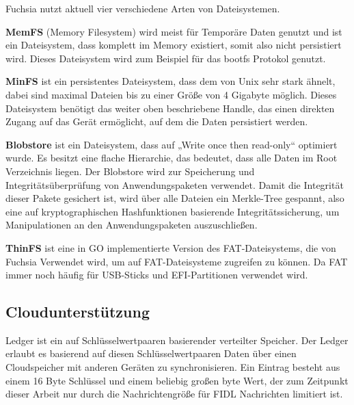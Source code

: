 \documentclass[a4paper]{scrartcl}
\begin{document}
Fuchsia nutzt aktuell vier verschiedene Arten von Dateisystemen.

\textbf{MemFS} (Memory Filesystem) wird meist für Temporäre Daten genutzt und ist ein Dateisystem, dass komplett im Memory existiert, somit also nicht persistiert wird. Dieses Dateisystem wird zum Beispiel für das bootfs Protokol genutzt.

\textbf{MinFS} ist ein persistentes Dateisystem, dass dem von Unix sehr stark ähnelt, dabei sind maximal Dateien bis zu einer Größe von 4 Gigabyte möglich. Dieses Dateisystem benötigt das weiter oben beschriebene Handle, das einen direkten Zugang auf das Gerät ermöglicht, auf dem die Daten persistiert werden.

\textbf{Blobstore} ist ein Dateisystem, dass auf „Write once then read-only“ optimiert wurde. Es besitzt eine flache Hierarchie, das bedeutet, dass alle Daten im Root Verzeichnis liegen. Der Blobstore wird zur Speicherung und Integritätsüberprüfung von Anwendungspaketen verwendet. Damit die Integrität dieser Pakete gesichert ist, wird über alle Dateien ein Merkle-Tree gespannt, also eine auf kryptographischen Hashfunktionen basierende Integritätssicherung, um Manipulationen an den Anwendungspaketen auszuschließen.

\textbf{ThinFS} ist eine in GO implementierte Version des FAT-Dateisystems, die von Fuchsia Verwendet wird, um auf FAT-Dateisysteme zugreifen zu können. Da FAT immer noch häufig für USB-Sticks und EFI-Partitionen verwendet wird.
\subsection{Cloudunterstützung}
\label{sec:Ledger}
Ledger ist ein auf Schlüsselwertpaaren basierender verteilter Speicher. Der Ledger erlaubt es basierend auf diesen Schlüsselwertpaaren Daten über einen Cloudspeicher mit anderen Geräten zu synchronisieren. Ein Eintrag besteht aus einem 16 Byte Schlüssel und einem beliebig großen byte Wert, der zum Zeitpunkt dieser Arbeit nur durch die Nachrichtengröße für FIDL Nachrichten limitiert ist.
\end{document}
